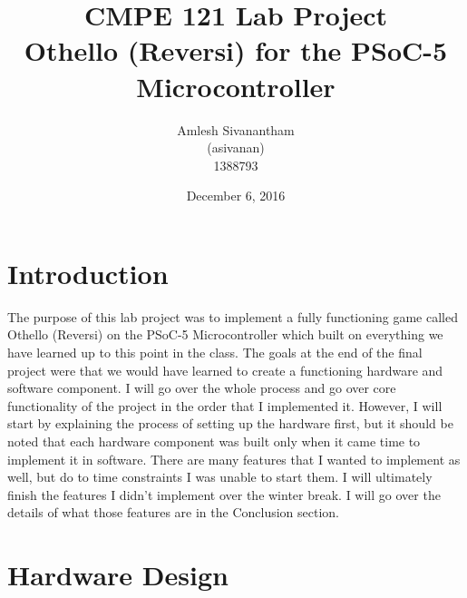 \documentclass[a4paper, 12pt]{article}
\title{\textbf{CMPE 121 Lab Project} \\ 
    \textbf{Othello (Reversi) for the PSoC-5 Microcontroller}}
\author{Amlesh Sivanantham \\ (asivanan) \\ 1388793}
\date{December 6, 2016}
\begin{document}
	
	\maketitle

	\section{Introduction} 

	The purpose of this lab project was to implement a fully functioning
    game called Othello (Reversi) on the PSoC-5 Microcontroller which built
    on everything we have learned up to this point in the class. The goals at
    the end of the final project were that we would have learned to create
    a functioning hardware and software component. I will go over the whole
    process and go over core functionality of the project in the order that I
    implemented it. However, I will start by explaining the process of
    setting up the hardware first, but it should be noted that each hardware
    component was built only when it came time to implement it in software.
    There are many features that I wanted to implement as well, but do to time
    constraints I was unable to start them. I will ultimately finish
    the features I didn't implement over the winter break. I will go over the
    details of what those features are in the Conclusion section.

    \section{Hardware Design}
 
\end{document}
